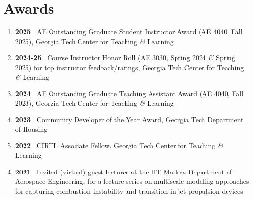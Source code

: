 \documentclass[letterpaper,11pt]{article}
\newcommand{\amp}{\emph{\&} }
\begin{document}
\section{Awards}
\vspace{9pt}
\begin{enumerate}
    \item \textbf{2025} \textemdash\ AE Outstanding Graduate Student Instructor Award (AE 4040, Fall 2025), Georgia Tech Center for Teaching \emph{\&} Learning
    \item \textbf{2024-25} \textemdash\ Course Instructor Honor Roll (AE 3030, Spring 2024 \amp Spring 2025) for top instructor feedback/ratings, Georgia Tech Center for Teaching \emph{\&} Learning
    \item \textbf{2024} \textemdash\ AE Outstanding Graduate Teaching Assistant Award (AE 4040, Fall 2023), Georgia Tech Center for Teaching \emph{\&} Learning
    \item \textbf{2023} \textemdash\ Community Developer of the Year Award, Georgia Tech Department of Housing%
    \item \textbf{2022} \textemdash\ CIRTL Associate Fellow, Georgia Tech Center for Teaching \emph{\&} Learning
\end{enumerate}

\begin{enumerate}
\setcounter{enumi}{3}
    \item \textbf{2021} \textemdash\  Invited (virtual) guest lecturer at the IIT Madras Department of Aerospace Engineering, for a lecture series on multiscale modeling approaches for capturing combustion instability and transition in jet propulsion devices
  \end{enumerate}
\end{document}
